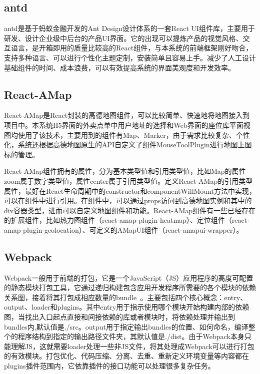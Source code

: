 \subsection{antd}
antd是基于蚂蚁金融开发的Ant Design设计体系的一套React UI组件库，主要用于研发、设计企业级中后台的产品UI界面。它的出现可以提炼产品的视觉风格、交互语言，是开箱即用的质量比较高的React组件，与本系统的前端框架刚好吻合，支持多种语言、可以进行个性化主题定制，安装简单且容易上手。减少了人工设计基础组件的时间、成本浪费，可以有效提高系统的界面美观度和开发效率。\\

\subsection{React-AMap}
React-AMap是React封装的高德地图组件，可以比较简单、快速地将地图接入到项目中。本系统H5界面的外卖点单中用户地址的选择和Web界面的座位库平面视图均使用了该技术，主要用到的组件有Map、Marker，由于需求比较复杂、个性化，系统还根据高德地图原生的API自定义了组件MouseToolPlugin进行地图上图标的管理。

React-AMap组件拥有的属性，分为基本类型值和引用类型值，比如Map的属性zoom属于数字类型值，属性center属于引用类型值。定义React-AMap的引用类型属性，最好在React生命周期中的constructor和componentWillMount方法中实现，可以在组件中进行引用。在组件中，可以通过props访问到高德地图实例和其中的div容器类型，进而可以自定义地图组件和功能。React-AMap组件有一些已经存在的扩展组件，比如热力图组件（react-amap-plugin-heatmap）、定位组件（react-amap-plugin-geolocation）、可定义的AMapUI组件（react-amapui-wrapper）。\\

\subsection{Webpack}
Webpack一般用于前端的打包，它是一个JavaScript（JS）应用程序的高度可配置的静态模块打包工具，它通过递归构建包含应用开发程序所需要的各个模块的依赖关系图，接着将其打包成相应数量的bundle~\cite{subramanian2017modularization}。主要包括四个核心概念：entry、output、loader和plugins。其中entry用于指示使用哪个模块开始构建内部的依赖图，当找出入口起点直接和间接依赖的库或者模块时，将依赖处理并输出到bundles内,默认值是./src。output用于指定输出bundles的位置、如何命名，编译整个的程序结构到指定的输出路径文件夹，其默认值是./dist。由于Webpack本身只能理解JS，这就需要loader处理一些非JS文件，将其处理成Webpack可以进行打包的有效模块。打包优化、代码压缩、分离、去重、重新定义环境变量等内容都在plugins插件范围内，它依靠插件的接口功能可以处理很多复杂任务。

